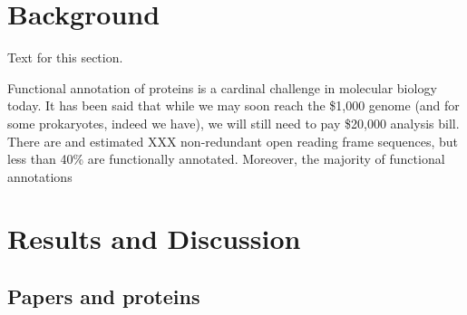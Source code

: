 \documentclass[10pt]{bmc_article}
\newenvironment{bmcformat}{\begin{raggedright}\baselineskip20pt\sloppy\setboolean{publ}{false}}{\end{raggedright}\baselineskip20pt\sloppy}
\begin{document}
\begin{bmcformat}




\section*{Background}
 Text for this section.

Functional annotation of proteins is a cardinal challenge in molecular biology today. It has
been said that while we may soon reach the \$1,000 genome (and for some prokaryotes, indeed
we have), we will still need to pay \$20,000 analysis bill. There are and estimated XXX
non-redundant open reading frame sequences, but less than 40\% are functionally annotated.
Moreover, the majority of functional annotations 


 
\section*{Results and Discussion}
  \subsection*{Papers and proteins}


\end{bmcformat}
\end{document}
